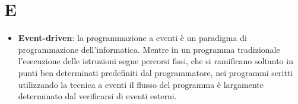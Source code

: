 \section{E}
\begin{itemize} 
	\item
	\textbf{Event-driven}: la programmazione a eventi è un paradigma di programmazione dell'informatica. Mentre in un programma tradizionale l'esecuzione delle istruzioni segue percorsi fissi, che si ramificano soltanto in punti ben determinati predefiniti dal programmatore, nei programmi scritti utilizzando la tecnica a eventi il flusso del programma è largamente determinato dal verificarsi di eventi esterni.
\end{itemize}